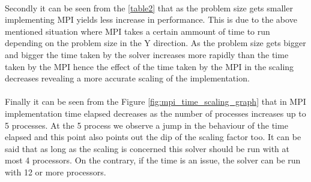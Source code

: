\documentclass{report}
\begin{document}
\paragraph{}
Secondly it can be seen from the \ref{table2} that as the problem size gets smaller implementing MPI yields less increase in performance. This is due to the above mentioned situation where MPI takes a certain ammount of time to run depending on the problem size in the Y direction. As the problem size gets bigger and bigger the time taken by the solver increases more rapidly than the time taken by the MPI hence the effect of the time taken by the MPI in the scaling decreases revealing a more accurate scaling of the implementation.
\paragraph{}
Finally it can be seen from the Figure \ref{fig:mpi_time_scaling_graph} that in MPI implementation time elapsed decreases as the number of processes increases up to 5 processes. At the 5 process we observe a jump in the behaviour of the time elapsed and this point also points out the dip of the scaling factor too. It can be said that as long as the scaling is concerned this solver should be run with at most 4 processors. On the contrary, if the time is an issue, the solver can be run with 12 or more processors.
\end{document}
